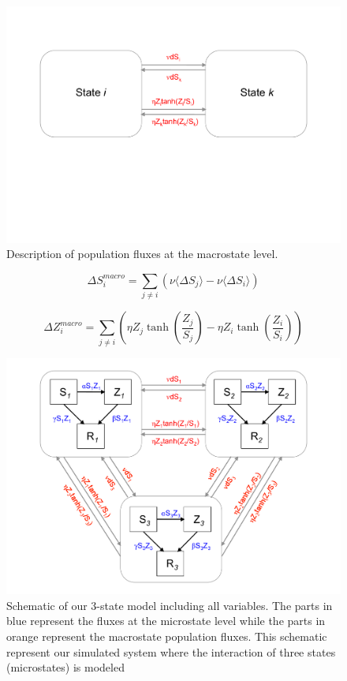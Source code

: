 \documentclass[11pt]{article} %
\begin{document}
\begin{figure}[h!]
\centerline{
\includegraphics[scale=0.45]{Images/macrostate.pdf}}
\caption{Description of population fluxes at the macrostate level.
\label{macrostate} }
\end{figure}

\begin{equation} \label{eq:smacro}
\Delta S_{i}^{macro} =  \sum_{j\neq i}{ \left( \nu \langle \Delta S_{j} \rangle - \nu  \langle \Delta S_{i} \rangle \right) }
\end{equation}

\begin{equation} \label{eq:zmacro}
\Delta Z_{i}^{macro} = \sum_{j\neq i}{\left( \eta Z_{j}\tanh \left( \frac{Z_{j}}{S_{j}}\right) -\eta Z_{i}\tanh \left( \frac{Z_{i}}{S_{i}}\right) \right)}
\end{equation}


\begin{figure}[h!]
\centerline{
\includegraphics[scale=0.45]{Images/total_model.pdf}}
\caption{Schematic of our 3-state model including all variables. The parts in blue represent the fluxes at the microstate level while the parts in orange represent the macrostate population fluxes. This schematic represent our simulated system where the interaction of three states (microstates) is modeled \label{totalmodel} }
\end{figure}
\end{document}
